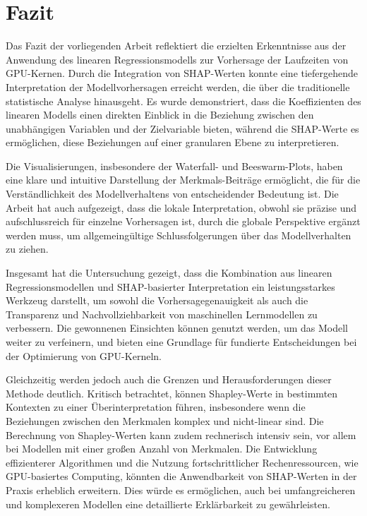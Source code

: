 \chapter{Fazit}

Das Fazit der vorliegenden Arbeit reflektiert die erzielten Erkenntnisse 
aus der Anwendung des linearen Regressionsmodells zur Vorhersage der Laufzeiten von GPU-Kernen. 
Durch die Integration von SHAP-Werten konnte eine tiefergehende Interpretation der Modellvorhersagen 
erreicht werden, die über die traditionelle statistische Analyse hinausgeht. Es wurde demonstriert,
dass die Koeffizienten des linearen Modells einen direkten Einblick in die Beziehung zwischen den 
unabhängigen Variablen und der Zielvariable bieten, während die SHAP-Werte es ermöglichen, 
diese Beziehungen auf einer granularen Ebene zu interpretieren.

Die Visualisierungen, insbesondere der Waterfall- und Beeswarm-Plots,
haben eine klare und intuitive Darstellung der Merkmals-Beiträge ermöglicht, die für die 
Verständlichkeit des Modellverhaltens von entscheidender Bedeutung ist. Die Arbeit hat auch aufgezeigt, 
dass die lokale Interpretation, obwohl sie präzise und aufschlussreich für einzelne Vorhersagen ist, 
durch die globale Perspektive ergänzt werden muss, um allgemeingültige Schlussfolgerungen über das Modellverhalten zu ziehen.

Insgesamt hat die Untersuchung gezeigt, dass die Kombination aus linearen Regressionsmodellen und SHAP-basierter 
Interpretation ein leistungsstarkes Werkzeug darstellt, um sowohl die Vorhersagegenauigkeit als auch die Transparenz 
und Nachvollziehbarkeit von maschinellen Lernmodellen zu verbessern. Die gewonnenen Einsichten können genutzt werden, 
um das Modell weiter zu verfeinern, und bieten eine Grundlage für fundierte Entscheidungen bei der Optimierung von GPU-Kerneln. 

Gleichzeitig werden jedoch auch die Grenzen und Herausforderungen dieser Methode deutlich.
Kritisch betrachtet, können Shapley-Werte in bestimmten Kontexten zu einer Überinterpretation führen, 
insbesondere wenn die Beziehungen zwischen den Merkmalen komplex und nicht-linear sind. 
Die Berechnung von Shapley-Werten kann zudem rechnerisch intensiv sein, vor allem bei Modellen mit einer großen Anzahl von Merkmalen. 
Die Entwicklung effizienterer Algorithmen und die Nutzung fortschrittlicher Rechenressourcen, wie GPU-basiertes Computing, 
könnten die Anwendbarkeit von SHAP-Werten in der Praxis erheblich erweitern. Dies würde es ermöglichen, auch bei umfangreicheren und 
komplexeren Modellen eine detaillierte Erklärbarkeit zu gewährleisten.

